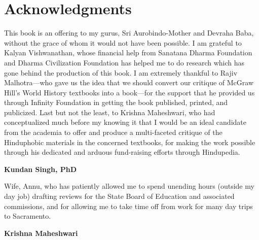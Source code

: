 \chapter*{Acknowledgments}

This book is an offering to my gurus, Sri Aurobindo-Mother and Devraha Baba, without the grace of whom it would not have been possible. I am grateful to Kalyan Vishwanathan, whose financial help from Sanatana Dharma Foundation and Dharma Civilization Foundation has helped me to do research which has gone behind the production of this book. I am extremely thankful to Rajiv Malhotra—who gave us the idea that we should convert our critique of McGraw Hill’s World History textbooks into a book—for the support that he provided us through Infinity Foundation in getting the book published, printed, and publicized. Last but not the least, to Krishna Maheshwari, who had conceptualized much before my knowing it that I would be an ideal candidate from the academia to offer and produce a multi-faceted critique of the Hinduphobic materials in the concerned textbooks, for making the work possible through his dedicated and arduous fund-raising efforts through Hindupedia.

\begin{flushright}
\textbf{Kundan Singh, PhD}
\end{flushright}


Wife, Annu, who has patiently allowed me to spend unending hours (outside my day job) drafting reviews for the State Board of Education and associated commissions, and for allowing me to take time off from work for many day trips to Sacramento.

\begin{flushright}
\textbf{Krishna Maheshwari}
\end{flushright}

